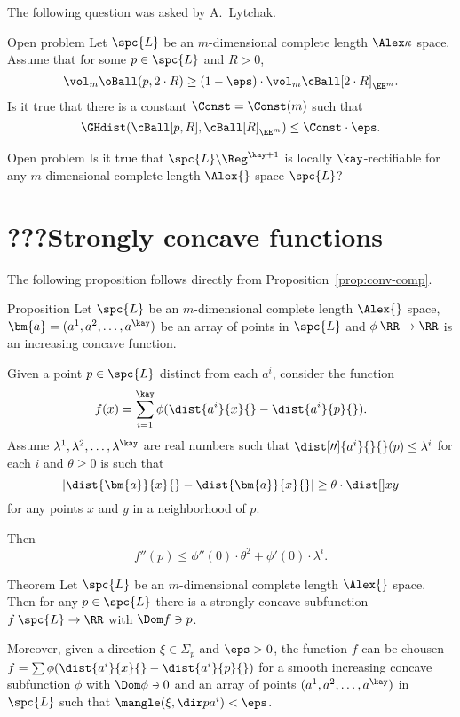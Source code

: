 The following question was asked by A.~Lytchak.

\begin{thm}{Open problem}
Let $\spc{L}$ be an $m$-dimensional complete length $\Alex\kappa$ space.
Assume that for some $p\in \spc{L}$ and $R>0$,
\[\vol_m\oBall(p,2\cdot R)\ge (1-\eps)\cdot\vol_m\cBall[2\cdot R]_{\EE^m}.\]
Is it true that there is a constant $\Const=\Const(m)$ such that
\[\GHdist(\cBall[p,R],\cBall[R]_{\EE^m})\le \Const\cdot\eps.\]
\end{thm}

\begin{thm}{Open problem}
Is it true that $\spc{L}\backslash\Reg^{\kay+1}$ 
is locally $\kay$-rectifiable for any $m$-dimensional complete length $\Alex{}$ space $\spc{L}$?
\end{thm}


\section{???Strongly concave functions}

The following proposition follows directly from Proposition~\ref{prop:conv-comp}.

\begin{thm}{Proposition}\label{prop:conv-comp-cbb}
Let $\spc{L}$ be an $m$-dimensional complete length $\Alex{}$ space, 
$\bm{a}=(a^1,a^2,\dots,a^\kay)$ be an array of points in $\spc{L}$
and $\phi\:\RR\to\RR$ is an increasing concave function.

Given a point $p\in \spc{L}$ distinct from each $a^i$,
 consider the function
$$f(x)=\sum_{i=1}^\kay\phi(\dist{a^i}{x}{}-\dist{a^i}{p}{}).$$
Assume $\lambda^1,\lambda^2,\dots,\lambda^\kay$ are real numbers such that
$\dist[\prime\prime]{a^i}{}{}(p)\le\lambda^i$ for each $i$
and $\theta\ge 0$ is such that
$$|\dist{\bm{a}}{x}{}-\dist{\bm{a}}{x}{}|
\ge 
\theta\cdot\dist[{{}}]{x}{y}{}$$
for any points $x$ and $y$ in a neighborhood of $p$.

Then 
$$f''(p)\le \phi''(0)\cdot \theta^2+\phi'(0)\cdot\lambda^i.$$

\end{thm}


\begin{thm}{Theorem}\label{thm:concave-thereis}
Let $\spc{L}$ be an $m$-dimensional complete length $\Alex{}$ space.
Then for any $p\in\spc{L}$ there is a strongly concave subfunction $f\: \spc{L}\to\RR$ with
$\Dom f\ni p$.

Moreover, given a direction $\xi\in\Sigma_p$  and $\eps>0$,
the function $f$ can be chousen 
$f=\sum\phi(\dist{a^i}{x}{}-\dist{a^i}{p}{})$
for a smooth increasing concave subfunction $\phi$ with $\Dom \phi\ni0$
and an array of points $(a^1,a^2,\dots,a^\kay)$ in $\spc{L}$
such that $\mangle(\xi,\dir p{a^i})<\eps$. 
\end{thm}

